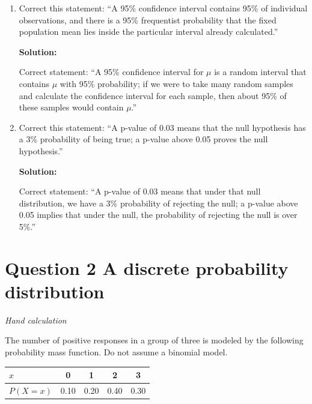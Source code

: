 \documentclass[11pt]{article}
\newcommand{\solution}{\par\medskip\noindent\textbf{Solution:}\par\vspace{0cm}}
\begin{document}
\begin{enumerate}[label=\textbf{(\alph*)}]
  Under iid sampling with finite variance, the standard error shrinks by a factor of 2 when the sample size is multiplied by 4. Observe the following calculation for a case where we increase the sample size from $n$ to $4n$:

  \[
  se(\bar{X}) = \frac{\sigma}{\sqrt{4n}} = \frac{\sigma}{2\sqrt{n}}
  \]

  Hence, as shown, our standard error reduces by half when the sample size is multiplied by 4.
  

  \item Correct this statement: ``A 95\% confidence interval contains 95\% of individual observations, and there is a 95\% frequentist probability that the fixed population mean lies inside the particular interval already calculated.''
  \solution

  Correct statement: ``A 95\% confidence interval for $\mu$ is a random interval that contains $\mu$ with 95\% probability; if we were to take many random samples and calculate the confidence interval for each sample, then about 95\% of these samples would contain $\mu$.''

  \item Correct this statement: ``A p-value of 0.03 means that the null hypothesis has a 3\% probability of being true; a p-value above 0.05 proves the null hypothesis.''
  \solution

  Correct statement: ``A p-value of 0.03 means that under that null distribution, we have a 3\% probability of rejecting the null; a p-value above 0.05 implies that under the null, the probability of rejecting the null is over 5\%.''
\end{enumerate}

\newpage
\section*{Question 2 \quad A discrete probability distribution}
\textit{Hand calculation}

The number of positive responses in a group of three is modeled by the following probability mass function. Do not assume a binomial model.

\begin{center}
\begin{tabular}{lcccc}
\toprule
$x$ & 0 & 1 & 2 & 3 \\
\midrule
$P(X = x)$ & 0.10 & 0.20 & 0.40 & 0.30 \\
\bottomrule
\end{tabular}
\end{center}
\end{document}
